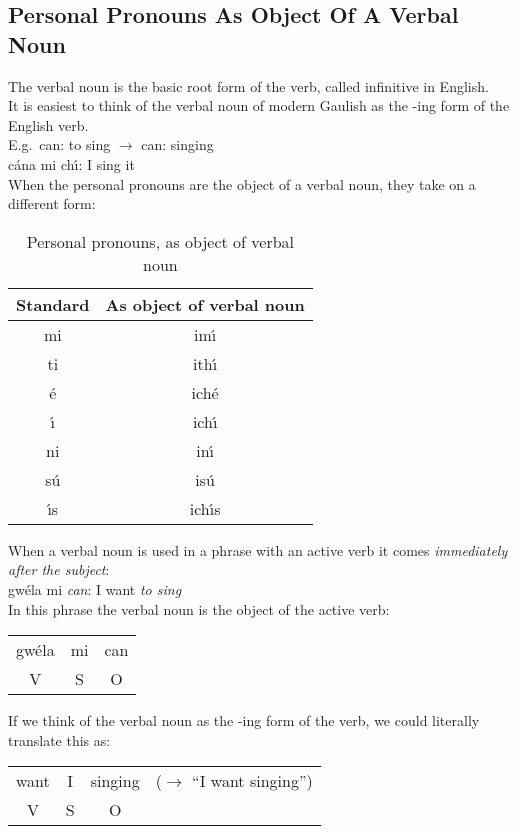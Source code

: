 \subsection{Personal Pronouns As Object Of A Verbal Noun}

The verbal noun is the basic root form of the verb, called infinitive in English.\\

It is easiest to think of the verbal noun of modern Gaulish as the -ing form of the English verb.\\

E.g.\ can: to sing $\rightarrow$ can: singing\\
c\'{a}na mi ch\'{\i}: I sing it\\

When the personal pronouns are the object of a verbal noun, they take on a different form:
\begin{table}[H]
\centering
\begin{tabular}{c|c}
  \textbf{Standard} & \textbf{As object of verbal noun}\\
  \toprule
  mi & im\'{\i}\\
  ti & ith\'{\i}\\
  \'{e} & ich\'{e}\\
  \'{\i} & ich\'{\i}\\
  ni & in\'{\i}\\
  s\'{u} & is\'{u}\\
  \'{\i}s & ich\'{\i}s
\end{tabular}
\caption{Personal pronouns, as object of verbal noun}
\label{personal_pronouns_as_object_of_verbal_noun}
\end{table}

When a verbal noun is used in a phrase with an active verb it comes \textit{immediately after the subject}:\\

gw\'{e}la mi \textit{can}: I want \textit{to sing}\\

In this phrase the verbal noun is the object of the active verb:
\begin{table}[H]
\begin{tabular}{ccc}
  gw\'{e}la & mi & can\\
  V & S & O
\end{tabular}
\label{verbal_noun_object_of_active_verb}
\end{table}

If we think of the verbal noun as the -ing form of the verb, we could literally translate this as:
\begin{table}[H]
\begin{tabular}{cccc}
  want & I & singing & ($\rightarrow$ ``I want singing'')\\
  V & S & O &
\end{tabular}
\label{verbal_noun_ing_form}
\end{table}

